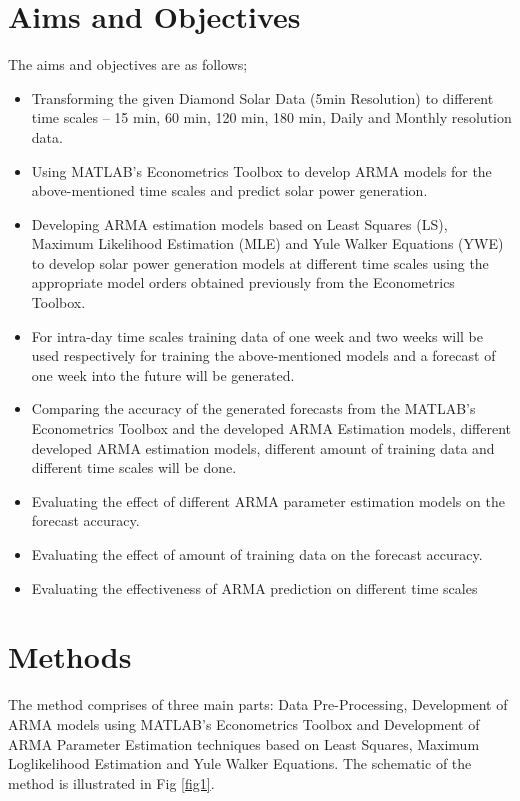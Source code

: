 \documentclass[journal]{IEEEtran}
\begin{document}
\section{Aims and Objectives}

The aims and objectives are as follows;



\begin{itemize}
  \item Transforming the given Diamond Solar Data (5min Resolution) to different time scales – 15 min, 60 min, 120 min, 180 min, Daily and Monthly resolution data.
  \item Using MATLAB’s Econometrics Toolbox to develop ARMA models for the above-mentioned time scales and predict solar power generation.

  \item Developing ARMA estimation models based on Least Squares (LS), Maximum Likelihood Estimation (MLE) and Yule Walker Equations (YWE) to develop solar power generation models at different time scales using the appropriate model orders obtained previously from the Econometrics Toolbox.
  \item For intra-day time scales training data of one week and two weeks will be used respectively for training the above-mentioned models and a forecast of one week into the future will be generated. 
  \item Comparing the accuracy of the generated forecasts from the MATLAB’s Econometrics Toolbox and the developed ARMA Estimation models, different developed ARMA estimation models, different amount of training data and different time scales will be done.
  \item Evaluating the effect of different ARMA parameter estimation models on the forecast accuracy.
  \item Evaluating the effect of amount of training data on the forecast accuracy.
  \item Evaluating the effectiveness of ARMA prediction on different time scales
  
   
\end{itemize}

\newpage

\section{Methods}

The method comprises of three main parts:  Data Pre-Processing, Development of ARMA models using MATLAB's Econometrics Toolbox and Development of ARMA Parameter Estimation techniques based on Least Squares, Maximum Loglikelihood Estimation and Yule Walker Equations. The schematic of the method is illustrated in Fig \ref{fig1}.
\end{document}
